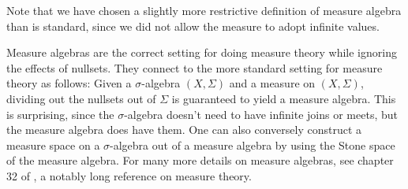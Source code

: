 \documentclass[a4paper]{amsproc}
\theoremstyle{plain}
\theoremstyle{definition}
\theoremstyle{remark}
\numberwithin{equation}{section}
\begin{document}
Note that we have chosen a slightly more restrictive definition of measure algebra than is standard, since we did not allow the measure to adopt infinite values.

Measure algebras are the correct setting for doing measure theory while ignoring the effects of nullsets. They connect to the more standard setting for measure theory as follows: Given a $\sigma$-algebra $(X,\Sigma)$ and a measure on $(X,\Sigma)$, dividing out the nullsets out of $\Sigma$ is guaranteed to yield a measure algebra. This is surprising, since the $\sigma$-algebra doesn't need to have infinite joins or meets, but the measure algebra does have them. One can also conversely construct a measure space on a $\sigma$-algebra out of a measure algebra by using the Stone space of the measure algebra. For many more details on measure algebras, see chapter 32 of \cite{fremlin}, a notably long reference on measure theory.
\end{document}

